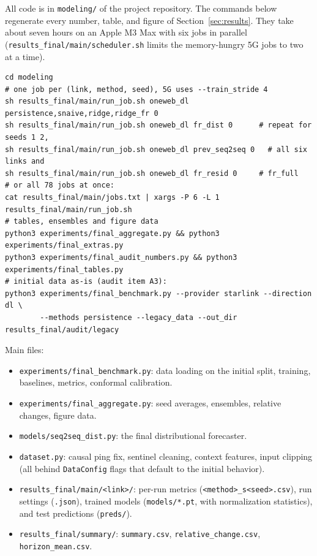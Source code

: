 All code is in \texttt{modeling/\allowbreak{}} of the project repository. The commands below regenerate every number, table, and figure of Section~\ref{sec:results}. They take about seven hours on an Apple M3 Max with six jobs in parallel (\texttt{results\_final/main/scheduler.sh} limits the memory-hungry 5G jobs to two at a time).

\begin{small}
\begin{verbatim}
cd modeling
# one job per (link, method, seed), 5G uses --train_stride 4
sh results_final/main/run_job.sh oneweb_dl persistence,snaive,ridge,ridge_fr 0
sh results_final/main/run_job.sh oneweb_dl fr_dist 0      # repeat for seeds 1 2,
sh results_final/main/run_job.sh oneweb_dl prev_seq2seq 0   # all six links and
sh results_final/main/run_job.sh oneweb_dl fr_resid 0     # fr_full
# or all 78 jobs at once:
cat results_final/main/jobs.txt | xargs -P 6 -L 1 results_final/main/run_job.sh
# tables, ensembles and figure data
python3 experiments/final_aggregate.py && python3 experiments/final_extras.py
python3 experiments/final_audit_numbers.py && python3 experiments/final_tables.py
# initial data as-is (audit item A3):
python3 experiments/final_benchmark.py --provider starlink --direction dl \
        --methods persistence --legacy_data --out_dir results_final/audit/legacy
\end{verbatim}
\end{small}

\noindent Main files:
\begin{itemize}[leftmargin=*]
  \item \texttt{experiments/\allowbreak{}final\_\allowbreak{}benchmark.py}: data loading on the initial split, training, baselines, metrics, conformal calibration.
  \item \texttt{experiments/\allowbreak{}final\_\allowbreak{}aggregate.py}: seed averages, ensembles, relative changes, figure data.
  \item \texttt{models/\allowbreak{}seq2seq\_\allowbreak{}dist.py}: the final distributional forecaster.
  \item \texttt{dataset.py}: causal ping fix, sentinel cleaning, context features, input clipping (all behind \texttt{DataConfig} flags that default to the initial behavior).
  \item \texttt{results\_\allowbreak{}final/\allowbreak{}main/\allowbreak{}<link>/\allowbreak{}}: per-run metrics (\texttt{<method>\_\allowbreak{}s<seed>.csv}), run settings (\texttt{.json}), trained models (\texttt{models/\allowbreak{}*.pt}, with normalization statistics), and test predictions (\texttt{preds/\allowbreak{}}).
  \item \texttt{results\_\allowbreak{}final/\allowbreak{}summary/\allowbreak{}}: \texttt{summary.csv}, \texttt{relative\_\allowbreak{}change.csv}, \texttt{horizon\_\allowbreak{}mean.csv}.
\end{itemize}
